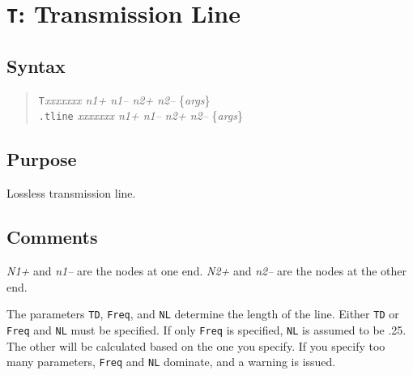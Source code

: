 %
%
%
%
\section{{\tt T}: Transmission Line}
\subsection{Syntax}
\begin{verse}
{\tt T}{\it xxxxxxx n1+ n1-- n2+ n2--} \{{\it args}\}\\
{\tt .tline} {\it xxxxxxx n1+ n1-- n2+ n2--} \{{\it args}\}
\end{verse}
\subsection{Purpose}

Lossless transmission line.
\subsection{Comments}

{\it N1+} and {\it n1--} are the nodes at one end.  {\it N2+} and {\it
n2--} are the nodes at the other end.

The parameters {\tt TD}, {\tt Freq}, and {\tt NL} determine the length
of the line.  Either {\tt TD} or {\tt Freq} and {\tt NL} must be
specified.  If only {\tt Freq} is specified, {\tt NL} is assumed to be
.25.  The other will be calculated based on the one you specify.  If
you specify too many parameters, {\tt Freq} and {\tt NL} dominate, and
a warning is issued.
